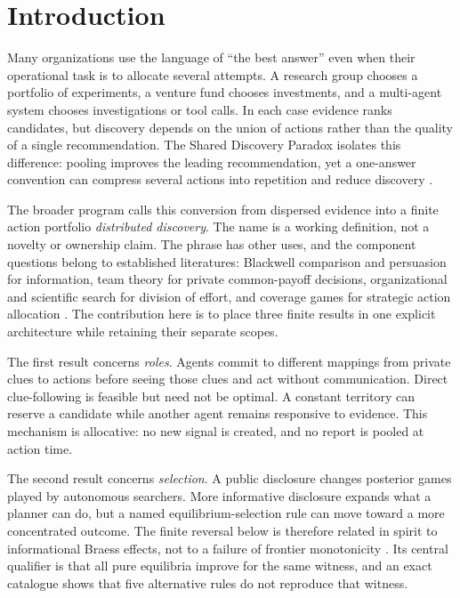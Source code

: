 \documentclass[11pt]{article}
\theoremstyle{remark}
\begin{document}
\section{Introduction}
Many organizations use the language of ``the best answer'' even when their
operational task is to allocate several attempts. A research group chooses a
portfolio of experiments, a venture fund chooses investments, and a multi-agent
system chooses investigations or tool calls. In each case evidence ranks
candidates, but discovery depends on the union of actions rather than the quality
of a single recommendation. The Shared Discovery Paradox isolates this difference:
pooling improves the leading recommendation, yet a one-answer convention can
compress several actions into repetition and reduce discovery
\citep{Nakajima2026SharedDiscovery}.

The broader program calls this conversion from dispersed evidence into a finite
action portfolio \emph{distributed discovery}. The name is a working definition,
not a novelty or ownership claim. The phrase has other uses, and the component
questions belong to established literatures: Blackwell comparison and persuasion
for information, team theory for private common-payoff decisions, organizational
and scientific search for division of effort, and coverage games for strategic
action allocation \citep{Blackwell1953,MarschakRadner1972,KamenicaGentzkow2011,
March1991,Kitcher1990,Vetta2002}. The contribution here is to place three finite
results in one explicit architecture while retaining their separate scopes.

The first result concerns \emph{roles}. Agents commit to different mappings from
private clues to actions before seeing those clues and act without communication.
Direct clue-following is feasible but need not be optimal. A constant territory
can reserve a candidate while another agent remains responsive to evidence. This
mechanism is allocative: no new signal is created, and no report is pooled at
action time.

The second result concerns \emph{selection}. A public disclosure changes posterior
games played by autonomous searchers. More informative disclosure expands what a
planner can do, but a named equilibrium-selection rule can move toward a more
concentrated outcome. The finite reversal below is therefore related in spirit to
informational Braess effects, not to a failure of frontier monotonicity
\citep{AcemogluEtAl2018}. Its central qualifier is that all pure equilibria improve
for the same witness, and an exact catalogue shows that five alternative rules do
not reproduce that witness.
\end{document}
